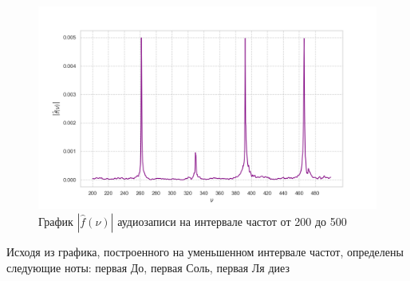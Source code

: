 \documentclass[a4paper, 16pt]{article}
\begin{document}
    \begin{figure}[!htb]
        \centering
        \includegraphics[scale=0.5]{f_v_reduced_200_to_500.png}
        \captionsetup{skip=0pt}
        \caption{График $|\hat{f}(\nu)|$ аудиозаписи на интервале частот от 200 до 500}
        \label{Рис:18}
    \end{figure}




    \noindent Исходя из графика, построенного на уменьшенном интервале частот, определены следующие ноты:
    первая До, первая Соль, первая Ля диез
\end{document}
